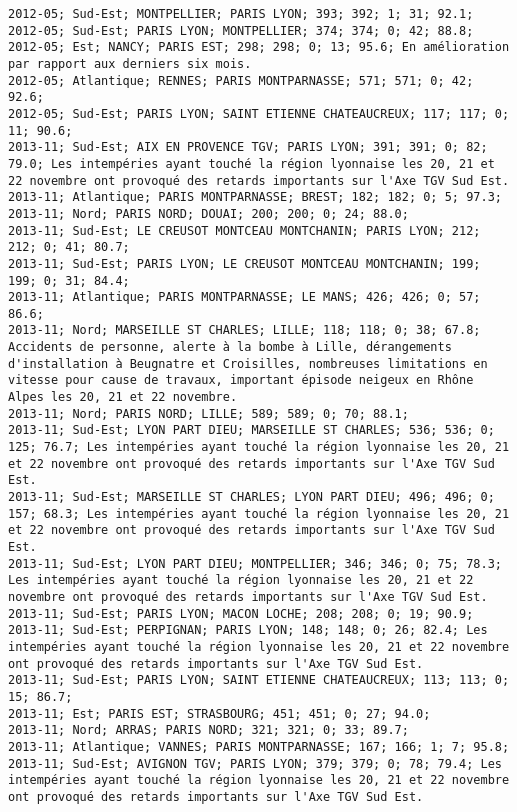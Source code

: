 \documentclass{article}
\begin{document}
\begin{Verbatim}[commandchars=\\\{\}]
2012-05; Sud-Est; MONTPELLIER; PARIS LYON; 393; 392; 1; 31; 92.1; 
2012-05; Sud-Est; PARIS LYON; MONTPELLIER; 374; 374; 0; 42; 88.8; 
2012-05; Est; NANCY; PARIS EST; 298; 298; 0; 13; 95.6; En amélioration par rapport aux derniers six mois.
2012-05; Atlantique; RENNES; PARIS MONTPARNASSE; 571; 571; 0; 42; 92.6; 
2012-05; Sud-Est; PARIS LYON; SAINT ETIENNE CHATEAUCREUX; 117; 117; 0; 11; 90.6; 
2013-11; Sud-Est; AIX EN PROVENCE TGV; PARIS LYON; 391; 391; 0; 82; 79.0; Les intempéries ayant touché la région lyonnaise les 20, 21 et 22 novembre ont provoqué des retards importants sur l'Axe TGV Sud Est.
2013-11; Atlantique; PARIS MONTPARNASSE; BREST; 182; 182; 0; 5; 97.3; 
2013-11; Nord; PARIS NORD; DOUAI; 200; 200; 0; 24; 88.0; 
2013-11; Sud-Est; LE CREUSOT MONTCEAU MONTCHANIN; PARIS LYON; 212; 212; 0; 41; 80.7; 
2013-11; Sud-Est; PARIS LYON; LE CREUSOT MONTCEAU MONTCHANIN; 199; 199; 0; 31; 84.4; 
2013-11; Atlantique; PARIS MONTPARNASSE; LE MANS; 426; 426; 0; 57; 86.6; 
2013-11; Nord; MARSEILLE ST CHARLES; LILLE; 118; 118; 0; 38; 67.8; Accidents de personne, alerte à la bombe à Lille, dérangements d'installation à Beugnatre et Croisilles, nombreuses limitations en vitesse pour cause de travaux, important épisode neigeux en Rhône Alpes les 20, 21 et 22 novembre.
2013-11; Nord; PARIS NORD; LILLE; 589; 589; 0; 70; 88.1; 
2013-11; Sud-Est; LYON PART DIEU; MARSEILLE ST CHARLES; 536; 536; 0; 125; 76.7; Les intempéries ayant touché la région lyonnaise les 20, 21 et 22 novembre ont provoqué des retards importants sur l'Axe TGV Sud Est.
2013-11; Sud-Est; MARSEILLE ST CHARLES; LYON PART DIEU; 496; 496; 0; 157; 68.3; Les intempéries ayant touché la région lyonnaise les 20, 21 et 22 novembre ont provoqué des retards importants sur l'Axe TGV Sud Est.
2013-11; Sud-Est; LYON PART DIEU; MONTPELLIER; 346; 346; 0; 75; 78.3; Les intempéries ayant touché la région lyonnaise les 20, 21 et 22 novembre ont provoqué des retards importants sur l'Axe TGV Sud Est.
2013-11; Sud-Est; PARIS LYON; MACON LOCHE; 208; 208; 0; 19; 90.9; 
2013-11; Sud-Est; PERPIGNAN; PARIS LYON; 148; 148; 0; 26; 82.4; Les intempéries ayant touché la région lyonnaise les 20, 21 et 22 novembre ont provoqué des retards importants sur l'Axe TGV Sud Est.
2013-11; Sud-Est; PARIS LYON; SAINT ETIENNE CHATEAUCREUX; 113; 113; 0; 15; 86.7; 
2013-11; Est; PARIS EST; STRASBOURG; 451; 451; 0; 27; 94.0; 
2013-11; Nord; ARRAS; PARIS NORD; 321; 321; 0; 33; 89.7; 
2013-11; Atlantique; VANNES; PARIS MONTPARNASSE; 167; 166; 1; 7; 95.8; 
2013-11; Sud-Est; AVIGNON TGV; PARIS LYON; 379; 379; 0; 78; 79.4; Les intempéries ayant touché la région lyonnaise les 20, 21 et 22 novembre ont provoqué des retards importants sur l'Axe TGV Sud Est.

\end{Verbatim}
\end{document}

